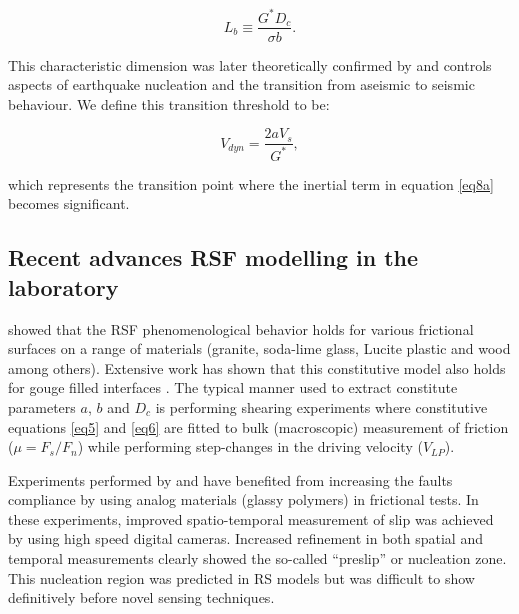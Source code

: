 \documentclass[draft]{agujournal2019}
\begin{document}
\begin{equation}
\label{eq8b}
L_{b} \equiv \frac{G^{*}D_{c}}{\sigma b}.
\end{equation}  

\noindent This characteristic dimension was later theoretically confirmed by  and controls aspects of earthquake nucleation and the transition from aseismic to seismic behaviour. We define this transition threshold to be:

\begin{equation}
\label{eq8c}
V_{dyn} = \frac{2 a V_{s}}{G^{*}},
\end{equation}  

\noindent which represents the transition point where the inertial term in equation \eqref{eq8a} becomes significant. 

\subsection{Recent advances RSF modelling in the laboratory}

 showed that the RSF phenomenological behavior holds for various frictional surfaces on a range of materials (granite, soda-lime glass, Lucite plastic and wood among others).  Extensive work has shown that this constitutive model also holds for gouge filled interfaces \cite<see review by>[]{Marone1998}.  The typical manner used to extract constitute parameters $a$, $b$ and $D_{c}$ is performing shearing experiments where constitutive equations \eqref{eq5} and \eqref{eq6} are fitted to bulk (macroscopic) measurement of friction ($\mu = F_{s}/F_{n}$) while performing step-changes in the driving velocity ($V_{LP}$).

Experiments performed by  and  have benefited from increasing the faults compliance by using analog materials (glassy polymers) in frictional tests. In these experiments, improved spatio-temporal measurement of slip was achieved by using high speed digital cameras. Increased refinement in both spatial and temporal measurements clearly showed the so-called ``preslip'' or nucleation zone.  This nucleation region was predicted in RS models \cite{Dieterich1992, Rubin2005, Ampuero2008} but was difficult to show definitively before novel sensing techniques.
\end{document}
